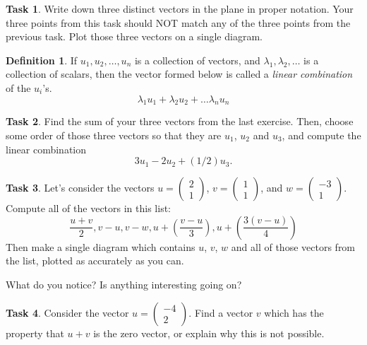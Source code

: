 \documentclass{tufte-book}
\theoremstyle{definition}
\newtheorem{task}{Task}
\newtheorem*{definition}{Definition}
\begin{document}
\begin{task}
Write down three distinct vectors in the plane in proper notation. 
Your three points from this task should NOT match any of the three points from the previous task.
Plot those three vectors on a single diagram.
\end{task}

\begin{definition}
If $u_1, u_2, \ldots, u_n$ is a collection of vectors, and $\lambda_1, \lambda_2, \ldots$ is a collection of scalars, then the vector formed below is called a \emph{linear combination} of the $u_i$'s.
\[
\lambda_1 u_1 + \lambda_2 u_2 + \dots \lambda_n u_n
\]
\end{definition}

\begin{task}
Find the sum of your three vectors from the last exercise. Then, choose some order of those three vectors so that they are $u_1$, $u_2$ and $u_3$, and compute the linear combination
\[
3u_1 - 2u_2 + (1/2)u_3.
\] 
\end{task}

\begin{task}
Let's consider the vectors $u=\left(\begin{smallmatrix} 2 \\1 \end{smallmatrix}\right)$, 
$v=\left(\begin{smallmatrix} 1\\ 1 \end{smallmatrix}\right)$, and $w=\left(\begin{smallmatrix} -3\\ 1 \end{smallmatrix}\right)$.
Compute all of the vectors in this list:
\[
\dfrac{u+v}{2}, v-u, v-w, u + \left(\dfrac{v-u}{3}\right), u + \left(\dfrac{3(v-u)}{4}\right)
\]
Then make a single diagram which contains $u$, $v$, $w$ and all of those vectors from the list, plotted as accurately as you can.

What do you notice? Is anything interesting going on?
\end{task}

\begin{task}
Consider the vector $u = \left(\begin{smallmatrix} -4 \\ 2\end{smallmatrix}\right)$. Find a vector $v$ which has the property that $u+v$ is the zero vector, or explain why this is not possible.
\end{task}
\end{document}
